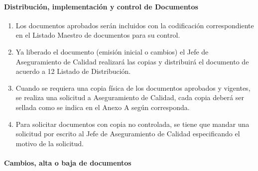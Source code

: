 \paragraph{Distribución, implementación y control de Documentos}

\begin{enumerate}
	\item Los documentos aprobados serán incluidos con la codificación correspondiente en el Listado Maestro de documentos para su control.
	\item Ya liberado el documento (emisión inicial o cambios) el Jefe de Aseguramiento de Calidad realizará las copias y distribuirá el documento de acuerdo a 12 Listado de Distribución.
	\item Cuando se requiera una copia física de los documentos aprobados y vigentes, se realiza una solicitud a Aseguramiento de Calidad, cada copia deberá ser sellada como se indica en el Anexo A según corresponda.
	\item Para solicitar documentos con copia no controlada, se tiene que mandar una solicitud por escrito al Jefe de Aseguramiento de Calidad especificando el motivo de la solicitud.
\end{enumerate}

\paragraph{Cambios, alta o baja de documentos}

